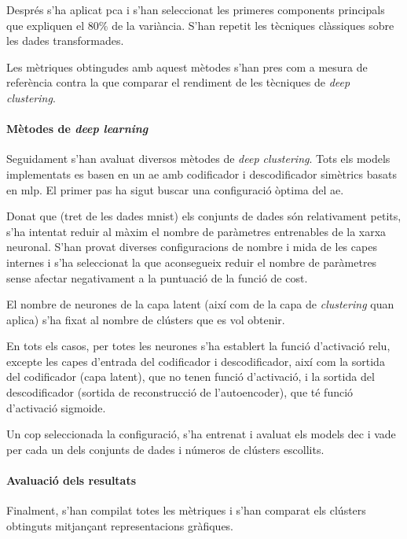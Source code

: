 \documentclass[CAT,BIB]{TFUOC}%
\begin{document}
        Després s'ha aplicat \gls{pca}
        i s'han seleccionat les primeres components principals
        que expliquen el 80\% de la variància.
        S'han repetit les tècniques clàssiques
        sobre les dades transformades.

        Les mètriques obtingudes amb aquest mètodes
        s'han pres com a mesura de referència
        contra la que comparar el rendiment de les tècniques de \textit{deep clustering}.

    \paragraph{Mètodes de \textit{deep learning}}
        Seguidament
        s'han avaluat diversos mètodes de \textit{deep clustering}.
        Tots els models implementats es basen en un \gls{ae}
        amb codificador i descodificador simètrics
        basats en \gls{mlp}.
        El primer pas ha sigut buscar una configuració òptima del \gls{ae}.

        Donat que (tret de les dades \gls{mnist}) els conjunts de dades són relativament petits,
        s'ha intentat reduir al màxim el nombre de paràmetres entrenables de la xarxa neuronal.
        S'han provat diverses configuracions de nombre i mida de les capes internes
        i s'ha seleccionat la que aconsegueix reduir el nombre de paràmetres
        sense afectar negativament a la puntuació de la funció de cost.

        El nombre de neurones de la capa latent
        (així com de la capa de \textit{clustering} quan aplica)
        s'ha fixat al nombre de clústers que es vol obtenir.

        En tots els casos,
        per totes les neurones s'ha establert la funció d'activació \gls{relu},
        excepte les capes d'entrada del codificador i descodificador,
        així com la sortida del codificador (capa latent),
        que no tenen funció d'activació,
        i la sortida del descodificador (sortida de reconstrucció de l'autoencoder),
        que té funció d'activació sigmoide.

        Un cop seleccionada la configuració,
        s'ha entrenat i avaluat els models \gls{dec} i \gls{vade}
        per cada un dels conjunts de dades
        i números de clústers escollits.

    \paragraph{Avaluació dels resultats}
        Finalment,
        s'han compilat totes les mètriques
        i s'han comparat els clústers obtinguts
        mitjançant representacions gràfiques.
\end{document}
